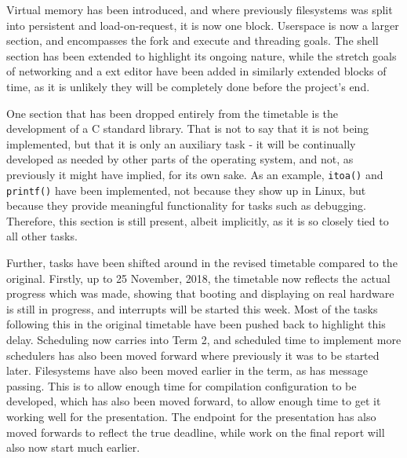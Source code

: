 \documentclass[10pt,a4paper]{article}
\newcommand{\code}[1]{\texttt{#1}}
\begin{document}
Virtual memory has been introduced, and where previously filesystems was split
into persistent and load-on-request, it is now one block. Userspace is now a
larger section, and encompasses the fork and execute and threading goals. The
shell section has been extended to highlight its ongoing nature, while the
stretch goals of networking and a ext editor have been added in similarly
extended blocks of time, as it is unlikely they will be completely done before
the project's end.

One section that has been dropped entirely from the timetable is the development
of a C standard library. That is not to say that it is not being implemented,
but that it is only an auxiliary task - it will be continually developed as
needed by other parts of the operating system, and not, as previously it might
have implied, for its own sake. As an example, \code{itoa()} and \code{printf()}
have been implemented, not because they show up in Linux, but because they
provide meaningful functionality for tasks such as debugging. Therefore, this
section is still present, albeit implicitly, as it is so closely tied to all
other tasks.

Further, tasks have been shifted around in the revised timetable compared to the
original. Firstly, up to 25 November, 2018, the timetable now reflects the
actual progress which was made, showing that booting and displaying on real
hardware is still in progress, and interrupts will be started this week.  Most
of the tasks following this in the original timetable have been pushed back to
highlight this delay. Scheduling now carries into Term 2, and scheduled time to
implement more schedulers has also been moved forward where previously it was to
be started later. Filesystems have also been moved earlier in the term, as has
message passing. This is to allow enough time for  compilation configuration to
be developed, which has also been moved forward, to allow enough time to get it
working well for the presentation. The endpoint for the presentation has also
moved forwards to reflect the true deadline, while work on the final report will
also now start much earlier.

\end{document}
